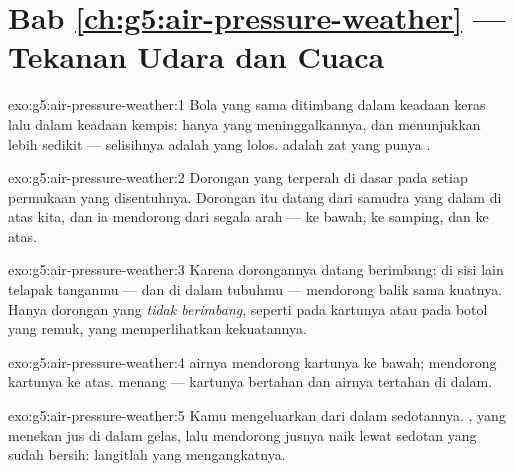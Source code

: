 \section*{Bab \ref{ch:g5:air-pressure-weather} --- Tekanan Udara dan Cuaca}

\begin{solution}{exo:g5:air-pressure-weather:1}
Bola yang sama ditimbang dalam keadaan keras lalu dalam keadaan
kempis: hanya  yang meninggalkannya, dan  menunjukkan
lebih sedikit --- selisihnya adalah   yang lolos. 
adalah zat yang punya .
\end{solution}

\begin{solution}{exo:g5:air-pressure-weather:2}
Dorongan  yang terperah di dasar  pada setiap permukaan
yang disentuhnya. Dorongan itu datang dari  samudra  yang
dalam di atas kita, dan ia mendorong dari segala arah --- ke bawah, ke
samping, dan ke atas.
\end{solution}

\begin{solution}{exo:g5:air-pressure-weather:3}
Karena dorongannya datang berimbang:  di sisi lain telapak
tanganmu --- dan di dalam tubuhmu --- mendorong balik sama kuatnya.
Hanya dorongan yang \emph{tidak berimbang}, seperti pada kartunya atau
pada botol yang remuk, yang memperlihatkan kekuatannya.
\end{solution}

\begin{solution}{exo:g5:air-pressure-weather:4}
 airnya mendorong kartunya ke bawah;  mendorong kartunya
ke atas.  menang --- kartunya bertahan dan airnya tertahan di
dalam.
\end{solution}

\begin{solution}{exo:g5:air-pressure-weather:5}
Kamu mengeluarkan \emph{} dari dalam sedotannya. , yang
menekan jus di dalam gelas, lalu mendorong jusnya naik lewat sedotan
yang sudah bersih: langitlah yang mengangkatnya.
\end{solution}

